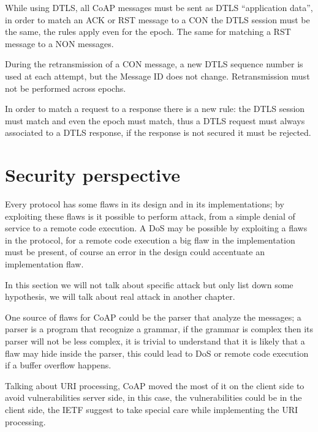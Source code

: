 	While using DTLS, all CoAP messages must be sent as DTLS “application data”, in order to match an ACK or RST message to a CON the DTLS session must be the same, the rules apply even for the epoch.\newline
	The same for matching a RST message to a NON messages.\newline
	
	During the retransmission of a CON message, a new DTLS sequence number is used at each attempt, but the Message ID does not change.\newline
	Retransmission must not be performed across epochs.\newline
	
	In order to match a request to a response there is a new rule: the DTLS session must match and even the epoch must match, thus a DTLS request must always associated to a DTLS response, if the response is not secured it must be rejected.
	
	\section{Security perspective}
	Every protocol has some flaws in its design and in its implementations; by exploiting these flaws is it possible to perform attack, from a simple denial of service to a remote code execution.\newline
	A DoS may be possible by exploiting a flaws in the protocol, for a remote code execution a big flaw in the implementation must be present, of course an error in the design could accentuate an implementation flaw.\newline
	
	In this section we will not talk about specific attack but only list down some hypothesis, we will talk about real attack in another chapter.\newline
	
	One source of flaws for CoAP could be the parser that analyze the messages; a parser is a program that recognize a grammar, if the grammar is complex then its parser will not be less complex, it is trivial to understand that it is likely that a flaw may hide inside the parser, this could lead to DoS or remote code execution if a buffer overflow happens.\newline
	
	Talking about URI processing, CoAP moved the most of it on the client side to avoid vulnerabilities server side, in this case, the vulnerabilities could be in the client side, the IETF suggest to take special care while implementing the URI processing.\newline
	
